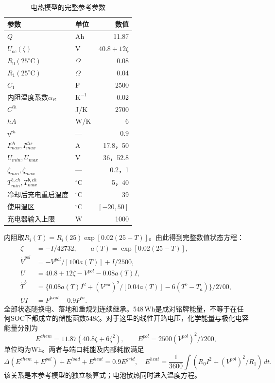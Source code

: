 \begin{table}[!ht]\centering
\caption{电热模型的完整参考参数}\label{tab:ecm_parameters}
\begin{tabular}{llr}\toprule
参数 & 单位 & 数值\\\midrule
$Q$ & Ah & 11.87\\
$U_{oc}(\zeta)$ & V & $40.8+12\zeta$\\
$R_0(25^\circ\mathrm C)$ & $\Omega$ & 0.08\\
$R_1(25^\circ\mathrm C)$ & $\Omega$ & 0.04\\
$C_1$ & F & 2500\\
内阻温度系数$\alpha_R$ & $\mathrm{K^{-1}}$ & 0.02\\
$C^{th}$ & J/K & 2700\\
$hA$ & W/K & 6\\
$\eta^{ch}$ & --- & 0.9\\
$I^{ch}_{max},I^{dis}_{max}$ & A & 17.8，50\\
$U_{min},U_{max}$ & V & 36，52.8\\
$\zeta_{min},\zeta_{max}$ & --- & 0.2，1\\
$T^{b,ch}_{min},T^{b,ch}_{max}$ & $^\circ$C & 5，40\\
冷却后充电重启温度 & $^\circ$C & 39\\
使用温区 & $^\circ$C & $[-20,50]$\\
充电器输入上限 & W & 1000\\\bottomrule
\end{tabular}
\end{table}
内阻取$R_i(T)=R_i(25)\exp[0.02(25-T)]$。由此得到完整数值状态方程：
\begin{align}
 \dot\zeta&=-I/42732,\qquad a(T)=\exp[0.02(25-T)],\\
 \dot V^{pol}&=-V^{pol}/[100a(T)]+I/2500,\\
 U&=40.8+12\zeta-V^{pol}-0.08a(T)I,\\
 \dot T^b&=\{0.08a(T)I^2+(V^{pol})^2/[0.04a(T)]-6(T^b-T_a)\}/2700,\\
 UI&=P^{load}-0.9P^{in}.
 \label{s0408:numeric_ecm}
\end{align}
全部状态随换电、落地和重规划连续继承。548\,Wh是成对铭牌能量，不等于在任何SOC下都成立的储能函数$548\zeta$。对于这里的线性开路电压，化学能量与极化电容能量分别为
\begin{equation}
 E^{chem}=11.87(40.8\zeta+6\zeta^2),\qquad
 E^{pol}=2500(V^{pol})^2/7200,
 \label{s0408:chemical_energy}
\end{equation}
单位均为Wh。两者与端口耗能及内部耗散满足
\begin{equation}
 \Delta(E^{chem}+E^{pol})+E^{load}+E^{heat}=0.9E^{grid},
 \quad E^{heat}=\frac1{3600}\int(R_0I^2+(V^{pol})^2/R_1)\,dt.
 \label{s0408:physical_ledger}
\end{equation}
该关系是本参考模型的独立核算式；电池散热同时进入温度方程。

